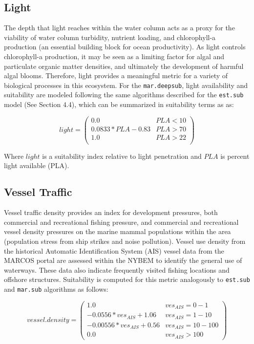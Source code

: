 \documentclass[
]{book}
\begin{document}
\hypertarget{light-1}{%
\subsection{Light}\label{light-1}}

The depth that light reaches within the water column acts as a proxy for the viability of water column turbidity, nutrient loading, and chlorophyll-a production (an essential building block for ocean productivity). As light controls chlorophyll-a production, it may be seen as a limiting factor for algal and particulate organic matter densities, and ultimately the development of harmful algal blooms. Therefore, light provides a meaningful metric for a variety of biological processes in this ecosystem. For the \texttt{mar.deepsub}, light availability and suitability are modeled following the same algorithms described for the \texttt{est.sub} model (See Section 4.4), which can be summarized in suitability terms as as:

\[light = \begin{pmatrix} 0.0 & PLA<10\\
0.0833*PLA-0.83 & PLA>70\\
1.0 & PLA>22\\
\end{pmatrix}\]

Where \(light\) is a suitability index relative to light penetration and \(PLA\) is percent light available (PLA).

\hypertarget{vessel-traffic}{%
\subsection{Vessel Traffic}\label{vessel-traffic}}

Vessel traffic density provides an index for development pressures, both commercial and recreational fishing pressure, and commercial and recreational vessel density pressures on the marine mammal populations within the area (population stress from ship strikes and noise pollution). Vessel use density from the historical Automatic Identification System (AIS) vessel data from the MARCOS portal are assessed within the NYBEM to identify the general use of waterways. These data also indicate frequently visited fishing locations and offshore structures. Suitability is computed for this metric analogously to \texttt{est.sub} and \texttt{mar.sub} algorithms as follows:

\[vessel.density = \begin{pmatrix} 1.0 & ves_{AIS}=0-1\\
-0.0556*ves_{AIS}+1.06 & ves_{AIS}=1-10\\
-0.00556*ves_{AIS}+0.56 & ves_{AIS}=10-100\\
0.0 & ves_{AIS}>100
\end{pmatrix}\]
\end{document}
